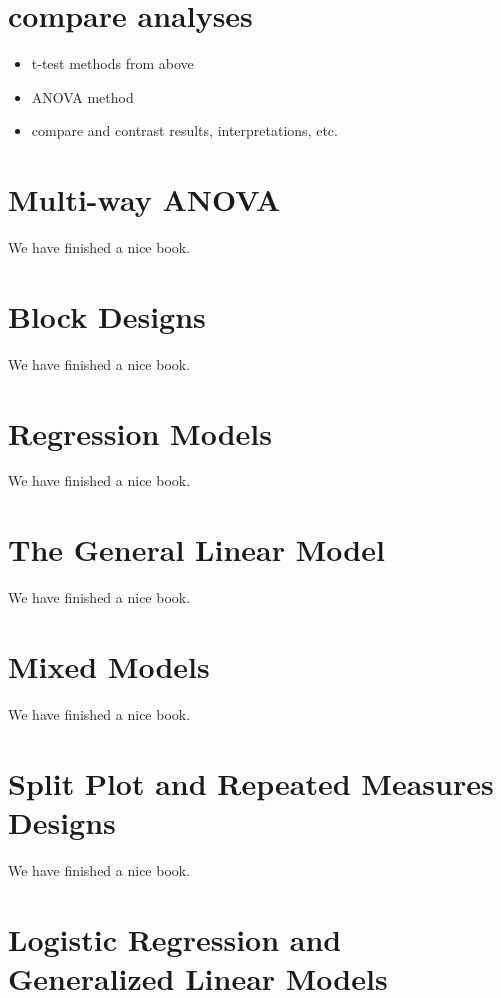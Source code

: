 \documentclass[]{book}
\providecommand{\tightlist}{%
  \setlength{\itemsep}{0pt}\setlength{\parskip}{0pt}}
\begin{document}
\chapter{compare analyses}\label{compare-analyses}

\begin{itemize}
\tightlist
\item
  t-test methods from above
\item
  ANOVA method
\item
  compare and contrast results, interpretations, etc.
\end{itemize}

\chapter{Multi-way ANOVA}\label{multiway}

We have finished a nice book.

\chapter{Block Designs}\label{block}

We have finished a nice book.

\chapter{Regression Models}\label{regression}

We have finished a nice book.

\chapter{The General Linear Model}\label{glm}

We have finished a nice book.

\chapter{Mixed Models}\label{mixedmodels}

We have finished a nice book.

\chapter{Split Plot and Repeated Measures
Designs}\label{repeatedmeasures}

We have finished a nice book.

\chapter{Logistic Regression and Generalized Linear
Models}\label{logistic}
\end{document}
